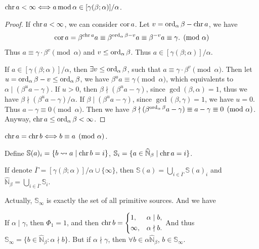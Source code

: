 \begin{theorem}\label{thm:collatz-character-finite-generated}
    $\operatorname{chr} a <\infty \Longleftrightarrow a\operatorname{mod} \alpha \in [\gamma (\beta; \alpha)]/\alpha$.
\end{theorem}
\begin{proof}
    If $\operatorname{chr} a <\infty$, we can consider $\operatorname{cor} a$. Let $v = \operatorname{ord}_{\alpha}\beta - \operatorname{chr} a$,  we have
    \[ \operatorname{cor} a = \beta^{\operatorname{chr} a}a \equiv\beta^{\operatorname{ord}_{\alpha}\beta - v}a \equiv \beta^{-v}a \equiv\gamma. \pmod{\alpha} \]
    Thus $a\equiv \gamma\cdot\beta^{v} \pmod{\alpha}$ and $v\le \operatorname{ord}_{\alpha}\beta$. Thus $a\in[\gamma (\beta; \alpha)]/\alpha$.

    If $a\in[\gamma (\beta; \alpha)]/\alpha$, then $\exists v\le \operatorname{ord}_{\alpha}\beta$, such that $a\equiv \gamma\cdot\beta^{v} \pmod{\alpha}$. Then let $u = \operatorname{ord}_{\alpha}\beta - v \le \operatorname{ord}_{\alpha}\beta$, we have $\beta^{u}a\equiv\gamma \pmod{\alpha}$, which equivalents to $\alpha \mid (\beta^{u}a-\gamma)$. If $u > 0$, then $\beta\nmid(\beta^{u}a-\gamma)$, since $\gcd(\beta, \alpha) = 1$, thus we have $\beta\nmid (\beta^{u}a-\gamma)/\alpha$. If $\beta\mid(\beta^{u}a-\gamma)$, since $\gcd(\beta, \gamma) = 1$, we have $u = 0$. Thus $a-\gamma \equiv 0 \pmod{\alpha}$. Then we have $\beta\nmid (\beta^{\operatorname{ord}_{\alpha}\beta}a-\gamma) \equiv a-\gamma \equiv 0 \pmod{\alpha}$. Anyway, $\operatorname{chr} a\le \operatorname{ord}_{\alpha}\beta < \infty$.
\end{proof}
\begin{corollary}\label{cor:chr-are-periodic}
    $\operatorname{chr} a = \operatorname{chr} b \Longleftrightarrow b \equiv a \pmod{\alpha}$.
\end{corollary}
\begin{definition}
    Define $\mathbb{S}(a)_{i} = \{ b\rightsquigarrow a \mid \operatorname{chr} b = i \}$, $\mathbb{S}_{i} = \{ a\in\widehat{\mathbb{N}}_{\beta} \mid \operatorname{chr} a = i \}$.
\end{definition}
\begin{proposition}
    If denote $\overline{\Gamma} = [\gamma (\beta; \alpha)]/\alpha \cup\{\infty\}$, then
    $\mathbb{S}(a) = \bigcup_{i\in\overline{\Gamma}}\mathbb{S}(a)_{i}$ and $\widehat{\mathbb{N}}_{\beta} = \bigcup_{i\in\overline{\Gamma}}\mathbb{S}_{i}$.
\end{proposition}
Actually, $\mathbb{S}_{\infty}$ is exactly the set of all primitive sources. And we have
\begin{proposition}
    If $\alpha \mid \gamma$, then $\Phi_1 = 1$, and then $\operatorname{chr} b = \left\{\begin{aligned}
        &1, &&\alpha\mid b, \\
        &\infty, &&\alpha\nmid b.
    \end{aligned}\right.$\newline
    And thus $\mathbb{S}_{\infty} = \{b \in \widehat{\mathbb{N}}_\beta: \alpha\nmid b\}$.
    But if $\alpha \nmid \gamma$, then $\forall b\in\alpha\widehat{\mathbb{N}}_\beta$, $b \in \mathbb{S}_{\infty}$.
\end{proposition}

